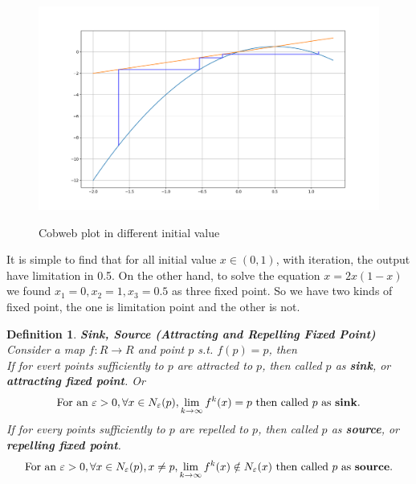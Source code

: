 \documentclass[12pt]{article}
\theoremstyle{plain}
\newtheorem{definition}{\textbf{Definition}}[section]
\begin{document}
\begin{figure}[H]
\begin{minipage}[c][0.6\width]{
   0.5\textwidth}
\end{minipage}
\begin{minipage}[c][0.6\width]{
   0.5\textwidth}
   \centering
   \includegraphics[width=1\textwidth]{figure/section1/cb04.png} \\
\end{minipage}
\caption{Cobweb plot in different initial value}\label{logistic-cobweb-plot}
\end{figure}


It is simple to find that for all initial value $x \in (0, 1)$, with iteration, the output have limitation in 0.5. On the other hand, to solve the equation $x = 2x(1-x)$ we found $x_1 = 0, x_2 = 1, x_3 = 0.5$ as three fixed point. So we have two kinds of fixed point, the one is limitation point and the other is not.


\begin{definition}\textbf{Sink, Source (Attracting and Repelling Fixed Point)}
\\\noindent Consider a map $f: R \rightarrow R$ and point $p$ s.t. $f(p) = p$, then
\\\noindent If for evert points sufficiently to $p$ are attracted to $p$, then called $p$ as \textbf{sink}, or \textbf{attracting fixed point}. Or
$$
\text{For an } \varepsilon > 0, \forall x \in N_\varepsilon(p), \lim_{k \rightarrow \infty}f^k(x) = p \text{ then called } p \text{ as \textbf{sink}}.
$$
If for every points sufficiently to $p$ are repelled to $p$, then called $p$ as \textbf{source}, or \textbf{repelling fixed point}.
$$
\text{For an } \varepsilon > 0, \forall x \in N_\varepsilon(p), x \neq p, \lim_{k \rightarrow \infty}f^k(x) \notin N_\varepsilon(x) \text{ then called } p \text{ as \textbf{source}}.
$$
\end{definition}
\end{document}
